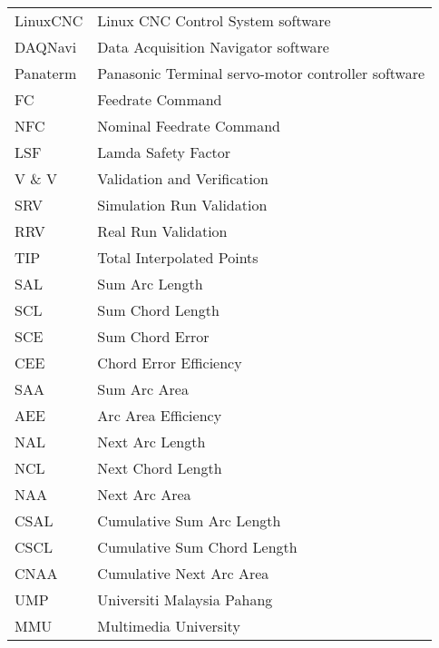 \onehalfspacing
\noindent
\begin{tabular}{p{3.0cm}p{10.0cm}} 


LinuxCNC & Linux CNC Control System software\\
DAQNavi  & Data Acquisition Navigator software\\
Panaterm & Panasonic Terminal servo-motor controller software\\

FC  & Feedrate Command\\
NFC & Nominal Feedrate Command\\
LSF & Lamda Safety Factor\\
V \& V & Validation and Verification\\
SRV & Simulation Run Validation\\
RRV & Real Run Validation\\
TIP & Total Interpolated Points\\
SAL & Sum Arc Length\\
SCL & Sum Chord Length\\
SCE & Sum Chord Error\\
CEE & Chord Error Efficiency\\
SAA & Sum Arc Area\\
AEE & Arc Area Efficiency\\

NAL & Next Arc Length\\
NCL & Next Chord Length\\
NAA & Next Arc Area\\
CSAL & Cumulative Sum Arc Length\\
CSCL & Cumulative Sum Chord Length\\
CNAA & Cumulative Next Arc Area\\

UMP & Universiti Malaysia Pahang\\
MMU & Multimedia University\\

\end{tabular}

